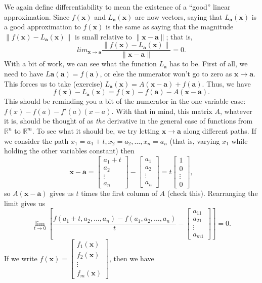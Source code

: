\documentclass[12pt,letterpaper]{article}
\newcommand{\R}{\mathbb{R}}
\newcommand{\x}{\mathbf{x}}
\newcommand{\aaa}{\mathbf{a}}
\newcommand{\len}[1]{\lVert #1\rVert}
\begin{document}
We again define differentiability to mean the existence of a ``good'' linear approximation. Since $f(\x)$ and $L_{\aaa}(\x)$ are now vectors, saying that $L_{\aaa}(\x)$ is a good approximation to $f(\x)$ is the same as saying that the magnitude $\len{f(\x)-L_{\aaa}(\x)}$ is small relative to $\len{\x-\aaa}$; that is,
\[
 lim_{\x\to\aaa}\frac{\len{f(\x)-L_{\aaa}(\x)}}{\len{\x-\aaa}} = 0.
\]
With a bit of work, we can see what the function $L_{\aaa}$ has to be. First of all, we need to have $L{\aaa}(\aaa) = f(\aaa)$, or else the numerator won't go to zero as $\x\to\aaa$. This forces us to take (exercise) $L_{\aaa}(\x) = A(\x-\aaa)+f(\aaa)$. Thus, we have
\[
 f(\x) - L_{\aaa}(\x) = f(\x)-f(\aaa)-A(\x-\aaa).
\]
This should be reminding you a bit of the numerator in the one variable case: $f(x)-f(a)-f'(a)(x-a)$. With that in mind, this matrix $A$, whatever it is, should be thought of as {\em the} derivative in the general case of functions from $\R^n$ to $\R^m$. To see what it should be, we try letting $\x\to\aaa$ along different paths. If we consider the path $x_1 = a_1+t, x_2=a_2, \ldots, x_n=a_n$ (that is, varying $x_1$ while holding the other variables constant) then
\[
 \x - \aaa = \begin{bmatrix}a_1+t\\a_2\\\vdots \\a_n\end{bmatrix} - \begin{bmatrix}a_1\\a_2\\\vdots \\a_n\end{bmatrix} = t\begin{bmatrix}1\\0\\\vdots\\0\end{bmatrix},
\]
so $A(\x-\aaa)$ gives us $t$ times the first column of $A$ (check this). Rearranging the limit gives us
\[
 \lim_{t\to 0}\left[\frac{f(a_1+t,a_2,\ldots, a_n)-f(a_1,a_2,\ldots, a_n)}{t} - \begin{bmatrix}a_{11}\\a_{21}\\\vdots \\a_{m1}\end{bmatrix}\right] = 0. 
\]
If we write $f(\x) = \begin{bmatrix}f_1(\x)\\f_2(\x)\\\vdots \\f_m(\x)\end{bmatrix}$, then we have
\end{document}
